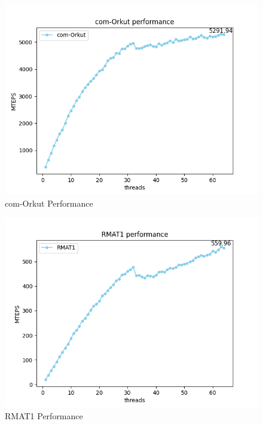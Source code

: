 \documentclass[10pt,twocolumn,letterpaper]{article}
\begin{document}
\begin{figure}[h]
    \centering
    \includegraphics[scale=0.5]{figures/com-Orkut.png}
    \caption{com-Orkut Performance}
    \label{fig:com-Orkut}
\end{figure}

\begin{figure}[h]
    \centering
    \includegraphics[scale=0.5]{figures/RMAT1.png}
    \caption{RMAT1 Performance}
    \label{fig:RMAT1}
\end{figure}
\end{document}
